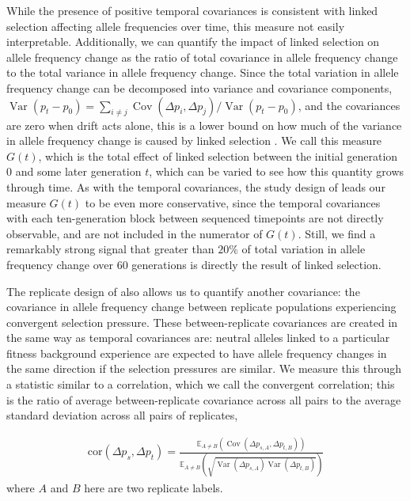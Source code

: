 \documentclass[11pt]{article}
\newcommand{\E}{\mathbb{E}}
\DeclareMathOperator{\var}{Var}
\DeclareMathOperator{\cov}{Cov}
\begin{document}
While the presence of positive temporal covariances is consistent with linked
selection affecting allele frequencies over time, this measure not easily
interpretable. Additionally, we can quantify the impact of linked selection on
allele frequency change as the ratio of total covariance in allele frequency
change to the total variance in allele frequency change. Since the total
variation in allele frequency change can be decomposed into variance and
covariance components, $\var(p_t - p_0) = \sum_{i \ne j} \cov(\Delta p_i,
\Delta p_j) / \var(p_t - p_0)$, and the covariances are zero when drift acts
alone, this is a lower bound on how much of the variance in allele frequency
change is caused by linked selection \parencite{Buffalo2019-io}. We call this
measure $G(t)$, which is the total effect of linked selection between the
initial generation $0$ and some later generation $t$, which can be varied to
see how this quantity grows through time. As with the temporal covariances, the
study design of \textcite{Barghi2019} leads our measure $G(t)$ to be even more
conservative, since the temporal covariances with each ten-generation block
between sequenced timepoints are not directly observable, and are not included
in the numerator of $G(t)$. Still, we find a remarkably strong signal that
greater than $20\%$ of total variation in allele frequency change over 60
generations is directly the result of linked selection.


The replicate design of \textcite{Barghi2019-qy} also allows us to quantify
another covariance: the covariance in allele frequency change between replicate
populations experiencing convergent selection pressure. These between-replicate
covariances are created in the same way as temporal covariances are: neutral
alleles linked to a particular fitness background experience are expected to
have allele frequency changes in the same direction if the selection pressures
are similar. We measure this through a statistic similar to a correlation,
which we call the convergent correlation; this is the ratio of average
between-replicate covariance across all pairs to the average standard deviation
across all pairs of replicates, 

\begin{align}
  \label{eq:conv-corr}
  \mathrm{cor}(\Delta p_s, \Delta p_t) = \frac{\E_{A\ne B} \left( \cov(\Delta p_{s,A}, \Delta p_{t,B}) \right)}{\E_{A\ne B} \left( \sqrt{\var(\Delta p_{s,A}) \var(\Delta p_{t,B})} \right)}
\end{align}
%
where $A$ and $B$ here are two replicate labels.
\end{document}
